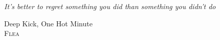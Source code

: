 
\setlength\epigraphrule{1.5pt}
\setlength{\epigraphwidth}{0.55\textwidth}
\thispagestyle{empty}
\vspace*{100pt}

\epigraph{\textit{\Large It's better to regret something you did than something you didn't do}}%
{Deep Kick, One Hot Minute\\ \textsc{Flea}}
